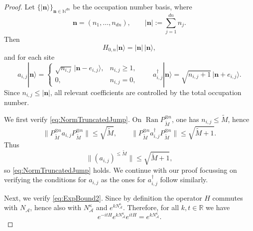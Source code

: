 \documentclass[11pt]{amsart}
\newcommand{\1}{\mathbbm{1}}
\theoremstyle{plain}
\theoremstyle{definition}
\theoremstyle{remark}
\numberwithin{equation}{section}
\begin{document}
\begin{proof}
Let \(\{|\mathbf n\rangle\}_{\mathbf n\in\mathbb N^{dn}}\) be the occupation number basis,
where
\[
\mathbf n=(n_1,\dots,n_{dn}),
\qquad
|\mathbf n|:=\sum_{j=1}^{dn} n_j.
\]
Then
\[
H_{0,n}|\mathbf n\rangle=|\mathbf n|\,|\mathbf n\rangle,
\]
and for each site
\[
a_{i,j}|\mathbf n\rangle
=
\begin{cases}
\sqrt{n_{i,j}}\,|\mathbf n-e_{i,j}\rangle,& n_{i,j}\ge 1,\\[1mm]
0,& n_{i,j}=0,
\end{cases}
\qquad
a_{i,j}^\dagger|\mathbf n\rangle
=
\sqrt{n_{i,j}+1}\,|\mathbf n+e_{i,j}\rangle.
\]
Since \(n_{i,j}\le |\mathbf n|\), all relevant coefficients are controlled by the total
occupation number.

We first verify \eqref{eq:NormTruncatedJump}. On \(\operatorname{Ran} P_{\widetilde M}^{\otimes n}\), one has
\(n_{i,j}\le \widetilde{M}\), hence
\[
\|P_{\widetilde M}^{\otimes n}a_{i,j} P_{\widetilde M}^{\otimes n}\|\le \sqrt {\widetilde M},
\qquad
\|P_{\widetilde M}^{\otimes n}a_{i,j}^\dagger P_{\widetilde M}^{\otimes n}\|\le \sqrt{\widetilde M+1}.
\]
Thus
\[
\|(a_{i,j})^{\le \widetilde{M}}\|\le \sqrt{\widetilde M+1},
\]
so \eqref{eq:NormTruncatedJump} holds. We continue with our proof focussing  on verifying the conditions for \(a_{i,j}\) as the ones for $a_{i,j}^\dagger$ follow similarly.


Next, we verify \eqref{eq:ExpBound2}. Since by definition the operator \(H\) commutes with \(N_{\mathcal A}\),
hence also with \(N_{\mathcal A}^\kappa\) and \(e^{kN_{\mathcal A}^\kappa}\). Therefore, for all
\(k,t\in\mathbb R\) we have
\[
e^{-itH}e^{kN_{\mathcal A}^\kappa}e^{itH}=e^{kN_{\mathcal A}^\kappa}.
\]



\end{proof}
\end{document}
